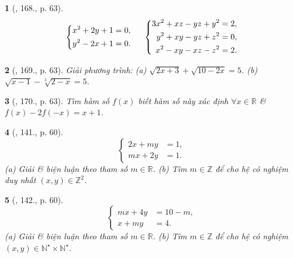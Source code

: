 \documentclass{article}
\newtheorem{baitoan}{}
\begin{document}
\begin{baitoan}[\cite{Tuyen_Toan_9_old}, 168., p. 63]
	\begin{equation*}
		\left\{\begin{split}
			x^2 + 2y + 1 &= 0,\\
			y^2 - 2x + 1 &= 0.
		\end{split}\right.\hspace{5mm}\left\{\begin{split}
			3x^2 + xz - yz + y^2 &= 2,\\
			y^2 + xy - yz + z^2 &= 0,\\
			x^2 - xy - xz - z^2 &= 2.
		\end{split}\right.
	\end{equation*}
\end{baitoan}

\begin{baitoan}[\cite{Tuyen_Toan_9_old}, 169., p. 63]
	Giải phương trình: (a) $\sqrt{2x + 3} + \sqrt{10 - 2x} = 5$. (b) $\sqrt{x - 1} - \sqrt[3]{2 - x} = 5$.
\end{baitoan}

\begin{baitoan}[\cite{Tuyen_Toan_9_old}, 170., p. 63]
	Tìm hàm số $f(x)$ biết hàm số này xác định $\forall x\in\mathbb{R}$ \& $f(x) - 2f(-x) = x + 1$.
\end{baitoan}

\begin{baitoan}[\cite{Dong_23_1001_toan_I}, 141., p. 60]
	\begin{equation*}
		\left\{\begin{split}
			2x + my &= 1,\\
			mx + 2y &= 1.
		\end{split}\right.
	\end{equation*}
	(a) Giải \& biện luận theo tham số $m\in\mathbb{R}$. (b) Tìm $m\in\mathbb{Z}$ để cho hệ có nghiệm duy nhất $(x,y)\in\mathbb{Z}^2$.
\end{baitoan}

\begin{baitoan}[\cite{Dong_23_1001_toan_I}, 142., p. 60]
	\begin{equation*}
		\left\{\begin{split}
			mx + 4y &= 10 - m,\\
			x + my &= 4.
		\end{split}\right.
	\end{equation*}
	(a) Giải \& biện luận theo tham số $m\in\mathbb{R}$. (b) Tìm $m\in\mathbb{Z}$ để cho hệ có nghiệm $(x,y)\in\mathbb{N}^\star\times\mathbb{N}^\star$.
\end{baitoan}
\end{document}
